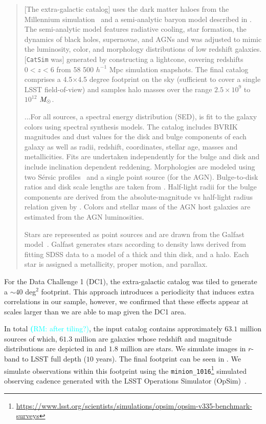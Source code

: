 \documentclass[twocolumn]{aastex62}
\newcommand{\rachel}[1]{{\textcolor{cyan}{{\textbf (RM: #1)}}}}
\begin{document}
\begin{quote}
[The extra-galactic catalog] uses the dark matter haloes from the Millennium simulation~\citep{2005Nature.435.629S} and a semi-analytic baryon model described in \citet{2006MNRAS.366..499D}. The semi-analytic model features radiative cooling, star formation, the dynamics of black holes, supernovae, and AGNs and was adjusted to mimic the luminosity, color, and morphology distributions of low redshift galaxies.  [\texttt{CatSim} was] generated by constructing a lightcone, covering redshifts $0<z<6$ from 58 500 $h^{-1}$ Mpc simulation snapshots. The final catalog comprises a 4.5$\times$4.5 degree footprint on the sky (sufficient to cover a single LSST field-of-view) and samples halo masses over the range $2.5\times10^{9}$ to $10^{12}$ $M_\odot$.

...For all sources, a spectral energy distribution (SED), is fit to the galaxy colors using \citet{2003MNRAS.344.1000B} spectral synthesis models. The \citet{2006MNRAS.366..499D} catalog includes BVRIK magnitudes and dust values for the disk and bulge components of each galaxy as well as radii, redshift, coordinates, stellar age, masses and metallicities. Fits are undertaken independently for the bulge and disk and include inclination dependent reddening. Morphologies are modeled using two S\'{e}rsic profiles~\citep{1963BAAA....6...41S} and a single point source (for the AGN). Bulge-to-disk ratios and disk scale lengths are taken from \citep{2006MNRAS.366..499D}. Half-light radii for the bulge components are derived from the absolute-magnitude vs half-light radius relation given by \citet{2011A&A...534A...3G}. Colors and stellar mass of the AGN host galaxies are estimated from the AGN luminosities.

Stars are represented as point sources and are drawn from the Galfast model~\citep{2008ApJ...673..864J}. Galfast generates stars according to density laws derived from fitting SDSS data to a model of a thick and thin disk, and a halo. Each star is assigned a metallicity, proper motion, and parallax.
\end{quote}

For the Data Challenge 1 (DC1), the extra-galactic catalog was tiled to generate a $\sim 40$ deg$^{2}$ footprint. This approach introduces a periodicity that induces extra correlations in our sample, however, we confirmed that these effects appear at scales larger than we are able to map given the DC1 area.

In total \rachel{after tiling?}, the input catalog contains approximately $63.1$ million sources of which, $61.3$ million are galaxies whose redshift and magnitude distributions are depicted in  and $1.8$ million are stars. We simulate images in $r$-band to LSST full depth ($10$ years). The final footprint can be seen in .  We simulate observations within this footprint using the \texttt{minion\_1016}\footnote{\url{https://www.lsst.org/scientists/simulations/opsim/opsim-v335-benchmark-surveys}} simulated observing cadence generated with the LSST Operations Simulator (OpSim)~\citep{2014SPIE.9150E..15D}.
\end{document}
